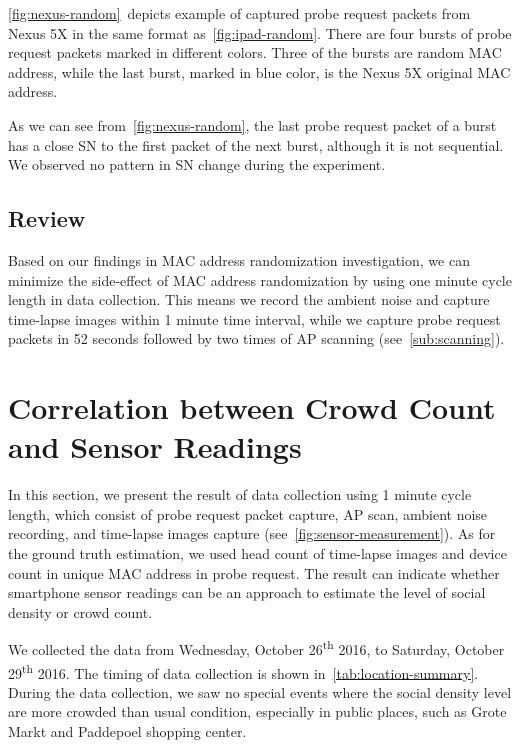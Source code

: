 	\autoref{fig:nexus-random}~depicts example of captured probe request packets from Nexus 5X in the same format as~\autoref{fig:ipad-random}. There are four bursts of probe request packets marked in different colors. Three of the bursts are random \ac{MAC} address, while the last burst, marked in blue color, is the Nexus 5X original \ac{MAC} address.

	As we can see from~\autoref{fig:nexus-random}, the last probe request packet of a burst has a close \ac{SN} to the first packet of the next burst, although it is not sequential. We observed no pattern in \ac{SN} change during the experiment.

	\subsection{Review} %
	\label{sub:review}
		Based on our findings in \ac{MAC} address randomization investigation, we can minimize the side-effect of \ac{MAC} address randomization by using one minute cycle length in data collection.
	This means we record the ambient noise and capture time-lapse images within 1 minute time interval, while we capture probe request packets in 52 seconds followed by two times of \ac{AP} scanning (see~\autoref{sub:scanning}).



\section{Correlation between Crowd Count and Sensor Readings} %
\label{sec:crowd_count_correlation-result}
In this section, we present the result of data collection using 1 minute cycle length, which consist of probe request packet capture, \ac{AP} scan, ambient noise recording, and time-lapse images capture (see~\autoref{fig:sensor-measurement}). As for the ground truth estimation, we used head count of time-lapse images and device count in unique \ac{MAC} address in probe request. The result can indicate whether smartphone sensor readings can be an approach to estimate the level of social density or crowd count.

We collected the data from Wednesday, October 26\textsuperscript{th} 2016, to Saturday, October 29\textsuperscript{th} 2016. The timing of data collection is shown in~\autoref{tab:location-summary}. During the data collection, we saw no special events where the social density level are more crowded than usual condition, especially in public places, such as Grote Markt and Paddepoel shopping center.

